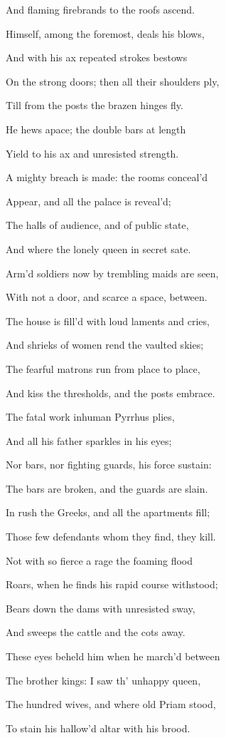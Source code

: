 And flaming firebrands to the roofs ascend.

Himself, among the foremost, deals his blows,

And with his ax repeated strokes bestows

On the strong doors; then all their shoulders ply,

Till from the posts the brazen hinges fly.

He hews apace; the double bars at length

Yield to his ax and unresisted strength.

A mighty breach is made: the rooms conceal’d

Appear, and all the palace is reveal’d;

The halls of audience, and of public state,

And where the lonely queen in secret sate.

Arm’d soldiers now by trembling maids are seen,

With not a door, and scarce a space, between.

The house is fill’d with loud laments and cries,

And shrieks of women rend the vaulted skies;

The fearful matrons run from place to place,

And kiss the thresholds, and the posts embrace.

The fatal work inhuman Pyrrhus plies,

And all his father sparkles in his eyes;

Nor bars, nor fighting guards, his force sustain:

The bars are broken, and the guards are slain.

In rush the Greeks, and all the apartments fill;

Those few defendants whom they find, they kill.

Not with so fierce a rage the foaming flood

Roars, when he finds his rapid course withstood;

Bears down the dams with unresisted sway,

And sweeps the cattle and the cots away.

These eyes beheld him when he march’d between

The brother kings: I saw th’ unhappy queen,

The hundred wives, and where old Priam stood,

To stain his hallow’d altar with his brood.

